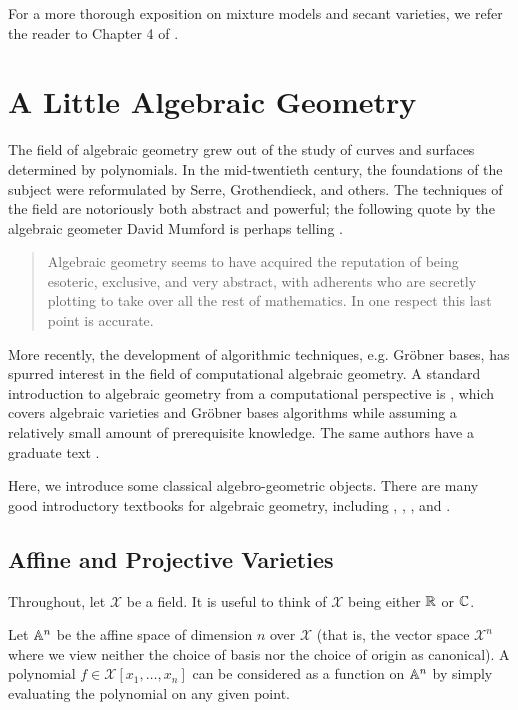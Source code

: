 \documentclass[cclicense]{hmcthesis}
\newcommand*{\F}{\mathcal{X}}
\numberwithin{equation}{section}
\begin{document}
    For a more thorough exposition on mixture models and secant varieties, we
    refer the reader to Chapter 4 of \citep{DSS08}.


\appendix

\chapter{A Little Algebraic Geometry}

    The field of algebraic geometry grew out of the study of curves and surfaces
    determined by polynomials.  In the mid-twentieth century, the foundations of
    the subject were reformulated by Serre, Grothendieck, and others.  The
    techniques of the field are notoriously both abstract and powerful; the
    following quote by the algebraic geometer David Mumford is perhaps telling
    \citep{Mum99}.
    \begin{quote}
        Algebraic geometry seems to have acquired the reputation of being
        esoteric, exclusive, and very abstract, with adherents who are secretly
        plotting to take over all the rest of mathematics.  In one respect this
        last point is accurate.
    \end{quote}
    More recently, the development of algorithmic techniques, e.g. Gröbner
    bases, has spurred interest in the field of computational algebraic
    geometry.  A standard introduction to algebraic geometry from a
    computational perspective is \citep{CLO97}, which covers algebraic varieties
    and Gröbner bases algorithms while assuming a relatively small amount of
    prerequisite knowledge.  The same authors have a graduate text \citep{CLO05}.

    Here, we introduce some classical algebro-geometric objects.  There are
    many good introductory textbooks for algebraic geometry, including
    \citep{Invitation}, \citep{Sha94}, \citep{Hart}, and \citep{Mum99}.

\section{Affine and Projective Varieties}
    \label{sec:varieties}
    Throughout, let $\F$ be a field.  It is useful to think of $\F$ being either
    $\mathbb{R}$ or $\mathbb{C}$.

    Let $\mathbb{A}^n$ be the affine space of dimension $n$ over $\F$ (that is, the
    vector space $\F^n$ where we view neither the choice of basis nor the choice
    of origin as canonical).  A polynomial $f \in \F[x_1, \ldots, x_n]$ can be
    considered as a function on $\mathbb{A}^n$ by simply evaluating the polynomial on
    any given point.
\end{document}
